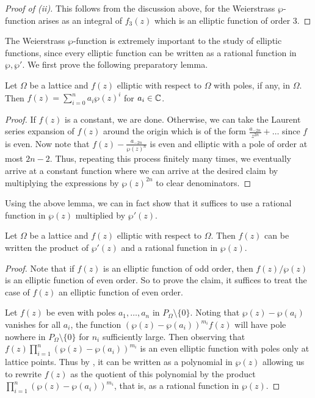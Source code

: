 \begin{proof}[Proof of (ii)]
    This follows from the discussion above, for the Weierstrass $\wp$-function arises as an integral of $f_{3}(z)$ which is an elliptic function of order 3. 
\end{proof}
The Weierstrass $\wp$-function is extremely important to the study of elliptic functions, since every elliptic function can be written as a rational function in $\wp,\wp'$. We first prove the following preparatory lemma. 
\begin{lemma}\label{lem: ellitpic function with poles only in lattice is polynomial in Weierstrass}
    Let $\Omega$ be a lattice and $f(z)$ elliptic with respect to $\Omega$ with poles, if any, in $\Omega$. Then $f(z)=\sum_{i=0}^{n}a_{i}\wp(z)^{i}$ for $a_{i}\in\mathbb{C}$. 
\end{lemma}
\begin{proof}
    If $f(z)$ is a constant, we are done. Otherwise, we can take the Laurent series expansion of $f(z)$ around the origin which is of the form $\frac{a_{-2n}}{z^{2n}}+\dots$ since $f$ is even. Now note that $f(z)-\frac{a_{-2n}}{\wp(z)^{n}}$ is even and elliptic with a pole of order at most $2n-2$. Thus, repeating this process finitely many times, we eventually arrive at a constant function where we can arrive at the desired claim by multiplying the expressions by $\wp(z)^{2n}$ to clear denominators.  
\end{proof}
Using the above lemma, we can in fact show that it suffices to use a rational function in $\wp(z)$ multiplied by $\wp'(z)$. 
\begin{proposition}\label{prop: elliptic functions in terms of Weierstrass}
    Let $\Omega$ be a lattice and $f(z)$ elliptic with respect to $\Omega$. Then $f(z)$ can be written the product of $\wp'(z)$ and a rational function in $\wp(z)$.  
\end{proposition}
\begin{proof}
    Note that if $f(z)$ is an elliptic function of odd order, then $f(z)/\wp(z)$ is an elliptic function of even order. So to prove the claim, it suffices to treat the case of $f(z)$ an elliptic function of even order. 

    Let $f(z)$ be even with poles $a_{1},\dots,a_{n}$ in $P_{\Omega}\setminus\{0\}$. Noting that $\wp(z)-\wp(a_{i})$ vanishes for all $a_{i}$, the function $(\wp(z)-\wp(a_{i}))^{m_{i}}f(z)$ will have pole nowhere in $P_{\Omega}\setminus\{0\}$ for $n_{i}$ sufficiently large. Then observing that $f(z)\prod_{i=1}^{n}(\wp(z)-\wp(a_{i}))^{m_{i}}$ is an even elliptic function with poles only at lattice points. Thus by , it can be written as a polynomial in $\wp(z)$ allowing us to rewrite $f(z)$ as the quotient of this polynomial by the product $\prod_{i=1}^{n}(\wp(z)-\wp(a_{i}))^{m_{i}}$, that is, as a rational function in $\wp(z)$. 
\end{proof}
